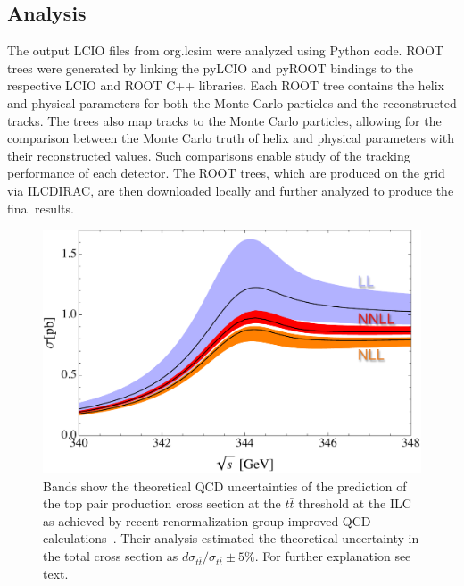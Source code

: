 \subsection{Analysis}
\label{sec:analysis}
The output LCIO files from org.lcsim were analyzed
using Python code.
 ROOT trees were generated by linking the pyLCIO and pyROOT bindings
to the respective LCIO and ROOT C++ libraries.
Each ROOT tree contains the helix and physical parameters
for both the Monte Carlo particles and 
the reconstructed tracks. %
The trees also map tracks
to the Monte Carlo particles,
allowing for the comparison between the Monte Carlo
truth of helix and physical parameters with their reconstructed values.
Such comparisons enable study of
 the tracking performance of each detector.%
The ROOT trees, which are produced on the grid via ILCDIRAC, are then
downloaded locally and further analyzed to produce the final results.



\iffalse
\begin{figure}
\centering
\includegraphics[width=0.7\columnwidth]{TotCrossCombined.pdf}
\caption{
Bands show the theoretical QCD uncertainties of the prediction of the top pair production cross section at the $t\bar t$ threshold
   at the ILC as achieved by recent renormalization-group-improved QCD calculations~\cite{Hoang:2013uda}. Their analysis estimated 
   the theoretical uncertainty in the total cross section as $d\sigma_{t\bar t}/\sigma_{t\bar t}\pm 5\%$. For further explanation see text.
}
\label{fig:tthresh-hs}
\end{figure}


